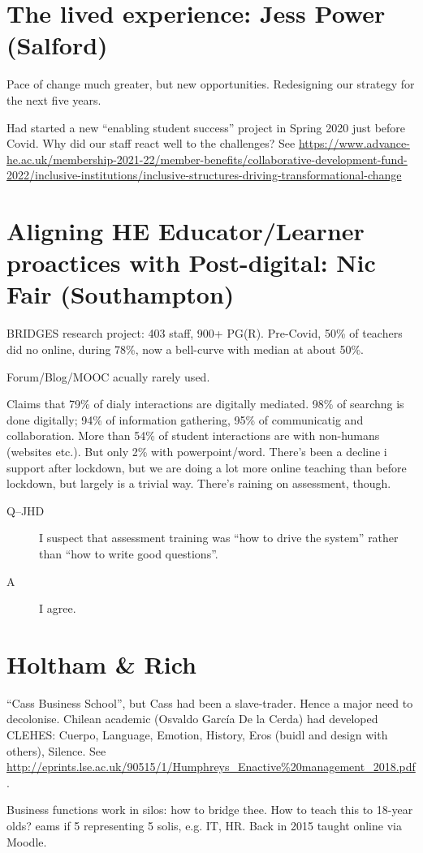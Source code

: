 \documentclass{article}
\begin{document}
\section{The lived experience: Jess Power (Salford)}
Pace of change much greater, but new opportunities. Redesigning our strategy for the next five years.
\par
Had started a new ``enabling student success'' project in Spring 2020 just before Covid. Why did our staff react well to the challenges? See \url{https://www.advance-he.ac.uk/membership-2021-22/member-benefits/collaborative-development-fund-2022/inclusive-institutions/inclusive-structures-driving-transformational-change}
\section{Aligning HE Educator/Learner proactices with Post-digital: Nic Fair (Southampton)}
BRIDGES research project: 403 staff, 900+ PG(R). Pre-Covid, 50\% of teachers did no online, during 78\%, now a bell-curve with median at about 50\%.
\par
Forum/Blog/MOOC acually rarely used.
\par
Claims that 79\% of dialy interactions are digitally mediated. 98\% of searchng is done digitally; 94\% of information gathering, 95\% of communicatig and collaboration. More than 54\% of student interactions are with non-humans (websites etc.). But only 2\% with powerpoint/word.  There's been a decline i support after lockdown, but we are doing a lot more online teaching than before lockdown, but largely is a trivial way. There's raining on assessment, though.
\begin{description}
\item[Q--JHD]I suspect that assessment training was ``how to drive the system'' rather than ``how to write good questions''.
\item[A]I agree.
\end{description}
\section{Holtham \& Rich}
``Cass Business School'', but Cass had been a slave-trader.  Hence a major need to decolonise. Chilean academic (Osvaldo Garc\'ia De la Cerda) had developed CLEHES:  Cuerpo, Language, Emotion, History, Eros (buidl and design with others), Silence.  See \url{http://eprints.lse.ac.uk/90515/1/Humphreys_Enactive%20management_2018.pdf}.
\par
Business functions work in silos: how to bridge thee.  How to teach this to 18-year olds?  eams if 5 representing 5 solis, e.g. IT, HR.  Back in 2015 taught online via Moodle.
\end{document}
